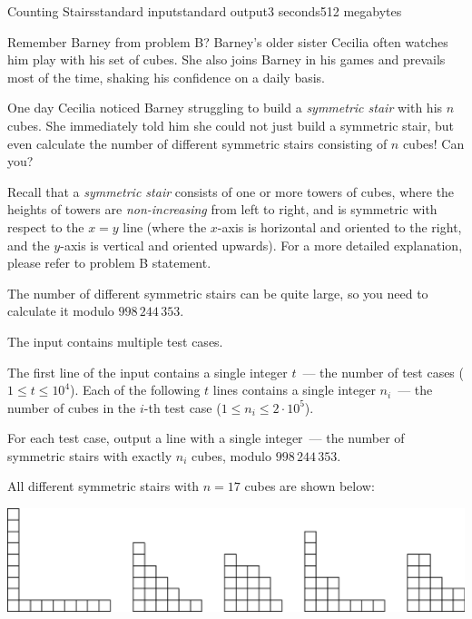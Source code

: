 \begin{problem}{Counting Stairs}{standard input}{standard output}{3 seconds}{512 megabytes}

Remember Barney from problem B? Barney's older sister Cecilia often watches him play with his set of cubes. She also joins Barney in his games and prevails most of the time, shaking his confidence on a daily basis.

One day Cecilia noticed Barney struggling to build a \textit{symmetric stair} with his $n$ cubes. She immediately told him she could not just build a symmetric stair, but even calculate the number of different symmetric stairs consisting of $n$ cubes! Can you?

Recall that a \textit{symmetric stair} consists of one or more towers of cubes, where the heights of towers are \textit{non-increasing} from left to right, and is symmetric with respect to the $x = y$ line (where the $x$-axis is horizontal and oriented to the right, and the $y$-axis is vertical and oriented upwards). For a more detailed explanation, please refer to problem B statement.

The number of different symmetric stairs can be quite large, so you need to calculate it modulo $998\,244\,353$.

\InputFile
The input contains multiple test cases.

The first line of the input contains a single integer $t$~--- the number of test cases ($1 \le t \le 10^4$). Each of the following $t$ lines contains a single integer $n_i$~--- the number of cubes in the $i$-th test case ($1 \le n_i \le 2 \cdot 10^5$).

\OutputFile
For each test case, output a line with a single integer~--- the number of symmetric stairs with exactly $n_i$ cubes, modulo $998\,244\,353$.

\Example

\begin{example}
%
\end{example}

\Note
All different symmetric stairs with $n = 17$ cubes are shown below:

\begin{center}
\includegraphics{sample-1.eps}
\end{center}


\end{problem}


